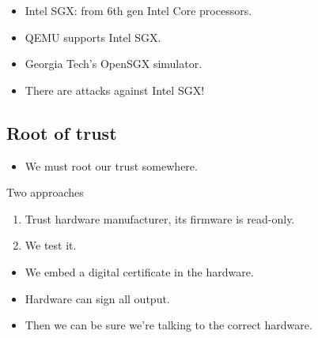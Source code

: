 \begin{frame}
  \begin{example}[Implementations]
    \begin{itemize}
      \item Intel SGX: from 6th gen Intel Core processors.
      \item QEMU supports Intel SGX.
      \item Georgia Tech's OpenSGX simulator.
    \end{itemize}
  \end{example}
\end{frame}

\begin{frame}
  \begin{remark}
    \begin{itemize}
      \item There are attacks against Intel SGX!
    \end{itemize}
  \end{remark}
\end{frame}

\subsection{Root of trust}

\begin{frame}
  \begin{remark}
    \begin{itemize}
      \item We must root our trust somewhere.
    \end{itemize}
  \end{remark}

  \pause

  \begin{block}{Two approaches}
    \begin{enumerate}
      \item Trust hardware manufacturer, its firmware is read-only.
      \item We test it.
    \end{enumerate}
  \end{block}
\end{frame}

\begin{frame}
  \begin{example}
    \begin{itemize}
      \item We embed a digital certificate in the hardware.
      \item Hardware can sign all output.
      \item Then we can be sure we're talking to the correct hardware.
    \end{itemize}
  \end{example}
\end{frame}

